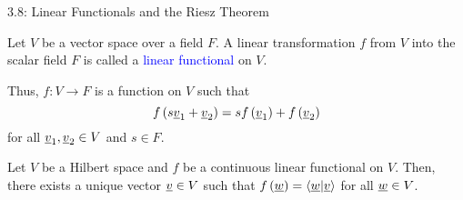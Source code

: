 \documentclass[10pt,letterpaper,english]{beamer}
\begin{document}
\begin{frame}{3.8: Linear Functionals and the Riesz Theorem}

\begin{definition}
Let $V$ be a vector space over a field $F$.
A linear transformation $f$ from $V$ into the scalar field $F$ is called a \textcolor{blue}{linear functional} on $V$.
\end{definition}

\begin{example}
Thus, $f\colon V \to F$ is a function on $V$ such that
\begin{equation*}
f \left( s \underline{v}_1 + \underline{v}_2 \right)
= s f \left( \underline{v}_1 \right) + f \left( \underline{v}_2 \right)
\end{equation*}
for all $\underline{v}_1, \underline{v}_2 \in V$ and $s \in F$.
\end{example}

\begin{theorem}[Riesz]
Let $V$ be a Hilbert space and $f$ be a continuous linear functional on $V$.
Then, there exists a unique vector $\underline{v} \in V$ such that $f \left( \underline{w} \right) = \left\langle \underline{w} | \underline{v} \right\rangle$ for all $\underline{w} \in V$.
\end{theorem}

\end{frame}
\end{document}
